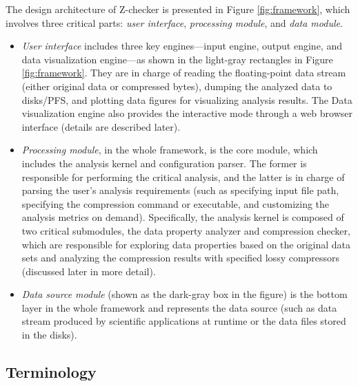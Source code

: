 The design architecture of Z-checker is presented in Figure \ref{fig:framework}, which involves three critical parts: \emph{user interface},  \emph{processing module}, and \emph{data module}.
\begin{itemize}
\item \emph{User interface} includes three key engines---input engine, output engine, and data visualization engine---as shown in the light-gray rectangles in Figure \ref{fig:framework}. They are in charge of reading the floating-point data stream (either original data or compressed bytes), dumping the analyzed data to disks/PFS, and plotting data figures for visualizing analysis results. The Data visualization engine also provides the interactive mode through a web browser interface (details are described later).
\item \emph{Processing module}, in the whole framework, is the core module, which includes the analysis kernel and configuration parser. The former is responsible for performing the critical analysis, and the latter is in charge of parsing the user's analysis requirements (such as specifying input file path, specifying the compression command or executable, and customizing the analysis metrics on demand). Specifically, the analysis kernel is composed of two critical submodules, the data property analyzer and compression checker, which are responsible for exploring data properties based on the original data sets and analyzing the compression results with specified lossy compressors (discussed later in more detail).
\item \emph{Data source module} (shown as the dark-gray box in the figure) is the bottom layer in the whole framework and represents the data source (such as data stream produced by scientific applications at runtime or the data files stored in the disks).
\end{itemize} 

\subsection{Terminology}

